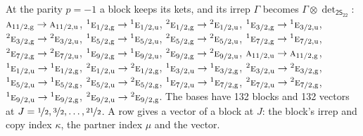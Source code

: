 \documentclass[10pt,a4paper]{article}
\numberwithin{equation}{section}
\newcommand{\grp}[1]{\mathsf{#1}}
\newcommand{\irr}[1]{\text{\normalfont\scshape #1}}
\newcommand{\conjpair}[1]{{}^{#1}}
\newcommand{\ptag}[1]{\mathrm{#1}}
\newcommand{\irrprod}{\otimes}
\newcommand{\mult}{\kappa}
\newcommand{\intx}{\mu}
\begin{document}
At the parity $p = -1$ a block keeps its kets, and its irrep $\Gamma$ becomes $\Gamma \irrprod \det_{\grp{2S_{22}}}$: $\irr{a}_{11/2,\ptag{g}} \to \irr{a}_{11/2,\ptag{u}}$, $\conjpair{1}\irr{e}_{1/2,\ptag{g}} \to \conjpair{1}\irr{e}_{1/2,\ptag{u}}$, $\conjpair{2}\irr{e}_{1/2,\ptag{g}} \to \conjpair{2}\irr{e}_{1/2,\ptag{u}}$, $\conjpair{1}\irr{e}_{3/2,\ptag{g}} \to \conjpair{1}\irr{e}_{3/2,\ptag{u}}$, $\conjpair{2}\irr{e}_{3/2,\ptag{g}} \to \conjpair{2}\irr{e}_{3/2,\ptag{u}}$, $\conjpair{1}\irr{e}_{5/2,\ptag{g}} \to \conjpair{1}\irr{e}_{5/2,\ptag{u}}$, $\conjpair{2}\irr{e}_{5/2,\ptag{g}} \to \conjpair{2}\irr{e}_{5/2,\ptag{u}}$, $\conjpair{1}\irr{e}_{7/2,\ptag{g}} \to \conjpair{1}\irr{e}_{7/2,\ptag{u}}$, $\conjpair{2}\irr{e}_{7/2,\ptag{g}} \to \conjpair{2}\irr{e}_{7/2,\ptag{u}}$, $\conjpair{1}\irr{e}_{9/2,\ptag{g}} \to \conjpair{1}\irr{e}_{9/2,\ptag{u}}$, $\conjpair{2}\irr{e}_{9/2,\ptag{g}} \to \conjpair{2}\irr{e}_{9/2,\ptag{u}}$, $\irr{a}_{11/2,\ptag{u}} \to \irr{a}_{11/2,\ptag{g}}$, $\conjpair{1}\irr{e}_{1/2,\ptag{u}} \to \conjpair{1}\irr{e}_{1/2,\ptag{g}}$, $\conjpair{2}\irr{e}_{1/2,\ptag{u}} \to \conjpair{2}\irr{e}_{1/2,\ptag{g}}$, $\conjpair{1}\irr{e}_{3/2,\ptag{u}} \to \conjpair{1}\irr{e}_{3/2,\ptag{g}}$, $\conjpair{2}\irr{e}_{3/2,\ptag{u}} \to \conjpair{2}\irr{e}_{3/2,\ptag{g}}$, $\conjpair{1}\irr{e}_{5/2,\ptag{u}} \to \conjpair{1}\irr{e}_{5/2,\ptag{g}}$, $\conjpair{2}\irr{e}_{5/2,\ptag{u}} \to \conjpair{2}\irr{e}_{5/2,\ptag{g}}$, $\conjpair{1}\irr{e}_{7/2,\ptag{u}} \to \conjpair{1}\irr{e}_{7/2,\ptag{g}}$, $\conjpair{2}\irr{e}_{7/2,\ptag{u}} \to \conjpair{2}\irr{e}_{7/2,\ptag{g}}$, $\conjpair{1}\irr{e}_{9/2,\ptag{u}} \to \conjpair{1}\irr{e}_{9/2,\ptag{g}}$, $\conjpair{2}\irr{e}_{9/2,\ptag{u}} \to \conjpair{2}\irr{e}_{9/2,\ptag{g}}$.
The bases have 132 blocks and 132 vectors at $J = \nicefrac{1}{2}, \nicefrac{3}{2}, \dots, \nicefrac{21}{2}$. \label{n:index.copy}\label{n:head.vector}A row gives a vector of a block at $J$: the block's irrep and copy index $\mult$, the partner index $\intx$ and the vector.
\end{document}
